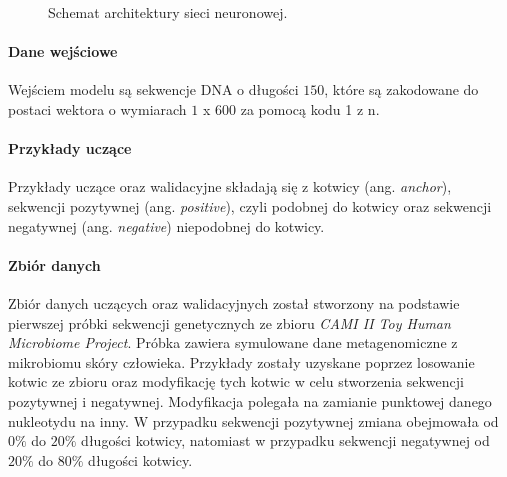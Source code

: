 \documentclass{article}
\begin{document}
{\begin{figure}[!htb]
\begin{center}
{

                        }
                    \end{center}
                    \caption{
                        Schemat architektury sieci neuronowej.
                    }\label{Picture:NeuralModel}
                \end{figure}

            \paragraph{Dane wejściowe}
                Wejściem modelu są sekwencje DNA o długości $150$, które są zakodowane do postaci wektora o wymiarach $1$ x $600$ za pomocą kodu 1 z n\cite{HarrisDavid:2007}.

            \paragraph{Przykłady uczące}
                Przykłady uczące oraz walidacyjne składają się z kotwicy (ang. \textit{anchor}), sekwencji pozytywnej (ang. \textit{positive}), czyli podobnej do kotwicy oraz sekwencji negatywnej (ang. \textit{negative}) niepodobnej do kotwicy.

            \paragraph{Zbiór danych}
                Zbiór danych uczących oraz walidacyjnych został stworzony na podstawie pierwszej próbki sekwencji genetycznych ze zbioru \textit{CAMI II Toy Human Microbiome Project}\cite{Fritz:2019}. Próbka zawiera symulowane dane metagenomiczne z mikrobiomu skóry człowieka. Przykłady zostały uzyskane poprzez losowanie kotwic ze zbioru oraz modyfikację tych kotwic w celu stworzenia sekwencji pozytywnej i negatywnej. Modyfikacja polegała na zamianie punktowej danego nukleotydu na inny. W przypadku sekwencji pozytywnej zmiana obejmowała od $0\%$ do $20\%$ długości kotwicy, natomiast w przypadku sekwencji negatywnej od $20\%$ do $80\%$ długości kotwicy.

}
\end{document}
